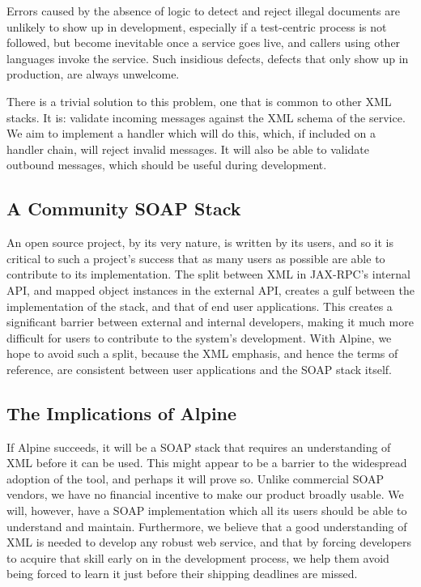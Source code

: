 Errors caused by the absence of logic to detect and reject illegal
documents are unlikely to show up in development, especially if a
test-centric process is not followed, but become inevitable once a
service goes live, and callers using other languages invoke the
service. Such insidious defects, defects that only show up in
production, are always unwelcome.

There is a trivial solution to this problem, one that is common to
other XML stacks. It is: validate incoming messages against the XML
schema of the service.  We aim to implement a handler which will do
this, which, if included on a handler chain, will reject invalid
messages. It will also be able to validate outbound messages, which
should be useful during development. 

\subsection{A Community SOAP Stack}
\label{alpine:community}


An open source project, by its very nature, is written by its users, and so it 
is critical to such a project's success that as many users as possible are
able to contribute to its implementation. The split between
XML in JAX-RPC's internal API, and mapped object instances in the external API,
creates a gulf between the implementation of the stack, and that of end user
applications. This creates a significant barrier between external and internal 
developers, making it much more difficult for users to contribute to the system's
development. With Alpine, we hope to avoid such a split, because the XML emphasis, 
and hence the terms of reference, are consistent between user applications and
the SOAP stack itself.


\subsection{The Implications of Alpine}
\label{alpine:implications}

If Alpine succeeds, it will be a SOAP stack that requires an
understanding of XML before it can be used. This might appear to be a
barrier to the widespread adoption of the tool, and perhaps it will
prove so. Unlike commercial SOAP vendors, we have no financial incentive
to make our product broadly usable. We will, however, have a SOAP
implementation which all its users should be able to understand and
maintain.  Furthermore, we believe that a good understanding of XML is
needed to develop any robust web service, and that by forcing developers to
acquire that skill early on in the development process, we help them avoid
being forced to learn it just before their shipping deadlines are missed.

